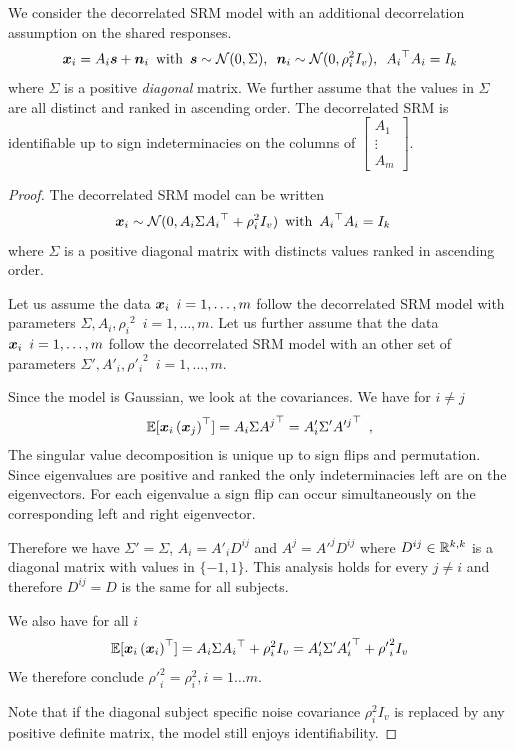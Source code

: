 \begin{proposition}
We consider the decorrelated SRM model with an additional decorrelation assumption on the shared responses.
\begin{align*}
\boldsymbol{x}_i = A_i \boldsymbol{s} + \boldsymbol{n}_i \enspace \text{with} \enspace \boldsymbol{s} \sim \mathcal{N}(0, \Sigma), \enspace\boldsymbol{n}_i \sim \mathcal{N}(0, \rho_i^2 I_v), \enspace {A_i}^{\top}A_i = I_k
\end{align*}
where $\Sigma$ is a positive \emph{diagonal} matrix. We further assume that the values in $\Sigma$ are all distinct and ranked in ascending order.
The decorrelated SRM is identifiable up to sign indeterminacies on the columns of 
$\begin{bmatrix}
A_1 \\
\vdots \\
A_m
\end{bmatrix}
$.
\end{proposition}
\begin{proof}
The decorrelated SRM model can be written
\begin{align*}
    &\boldsymbol{x}_i \sim \mathcal{N}(0, A_i \Sigma {A_i}^{\top} + \rho_i^2 I_v) \enspace \text{with}\enspace  {A_i}^{\top}A_i = I_k
\end{align*}
where $\Sigma$ is a positive diagonal matrix with distincts values ranked in ascending order.

Let us assume the data $\boldsymbol{x}_i \enspace i=1, \dots, m$ follow the decorrelated SRM model with parameters $\Sigma, A_i, {\rho_i}^2 \enspace i=1, \dots, m$. Let us further assume that the data $\boldsymbol{x}_i \enspace i=1, \dots, m$ follow the decorrelated SRM model with an other set of parameters $\Sigma', A'_i, {\rho'_i}^2 \enspace i=1, \dots, m$.

Since the model is Gaussian, we look at the covariances.
We have for $i \neq j$
\begin{align*}
    \mathbb{E}[\boldsymbol{x}_i\left(\boldsymbol{x}_j\right)^{\top}] = A_i\Sigma {A^j}^{\top} = A'_i \Sigma'{A'^j}^{\top} \enspace, 
\end{align*}
The singular value decomposition is unique up to sign flips and permutation. Since eigenvalues are positive and ranked the only indeterminacies left are on the eigenvectors. For each eigenvalue a sign flip can occur simultaneously on the corresponding left and right eigenvector.

Therefore we have $\Sigma' = \Sigma$, $A_i = A'_i D^{ij}$ and $A^j = A'^j D^{ij}$ where $D^{ij} \in \mathbb{R}^{k, k}$ is a diagonal matrix with values in $\{-1, 1\}$. This analysis holds for every $j \neq i$ and therefore $D^{ij} = D$ is the same for all subjects.

We also have for all $i$
\begin{align*}
    \mathbb{E}[\boldsymbol{x}_i \left(\boldsymbol{x}_i\right)^{\top}] = A_i \Sigma {A_i}^{\top} + \rho_i^2 I_v =  A'_i \Sigma' {A'_i}^{\top}  + {\rho'}_i^2 I_v\\
\end{align*}
We therefore conclude ${\rho'}_i^2 = \rho_i^2, i=1 \dots m$.

Note that if the diagonal subject specific noise covariance $\rho_i^2 I_v$ is replaced by any positive definite matrix, the model still enjoys identifiability.
\end{proof}

